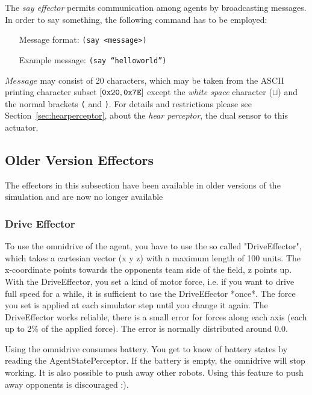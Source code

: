 The \emph{say effector} permits communication among agents by broadcasting
messages. In order to say something, the following command has to be employed:
\begin{itemize}
	\item[Message format:] \texttt{(say <message>)}
	\item[Example message:] \texttt{(say ``helloworld'')}
\end{itemize}
$Message$ may consist of 20 characters, which may be taken from the ASCII 
printing character subset $[{\tt 0x20}, {\tt 0x7E]}$ except the {\it white
space}  character ($\sqcup$) and the normal brackets {\tt(} and {\tt )}. 
For details and restrictions please see Section~\ref{sec:hearperceptor}, about
the \emph{hear perceptor}, the dual sensor to this actuator.

\subsection{Older Version Effectors}
\label{sec:olderversioneffectors}

The effectors in this subsection have been available in older versions of the
simulation and are now no longer available

\subsubsection{Drive Effector}
\label{sec:driveeffector}

To use the omnidrive of the agent, you have to use the so called
"DriveEffector", which takes a cartesian vector (x y z) with a maximum
length of 100 units. The x-coordinate points towards the opponents
team side of the field, z points up. With the DriveEffector, you set a
kind of motor force, i.e. if you want to drive full speed for a while,
it is sufficient to use the DriveEffector *once*. The force you set is
applied at each simulator step until you change it again. The
DriveEffector works reliable, there is a small error for forces along
each axis (each up to 2\% of the applied force). The error is normally
distributed around 0.0.

Using the omnidrive consumes battery. You get to know of battery
states by reading the AgentStatePerceptor. If the battery is empty,
the omnidrive will stop working. It is also possible to push away
other robots. Using this feature to push away opponents is discouraged
:).

